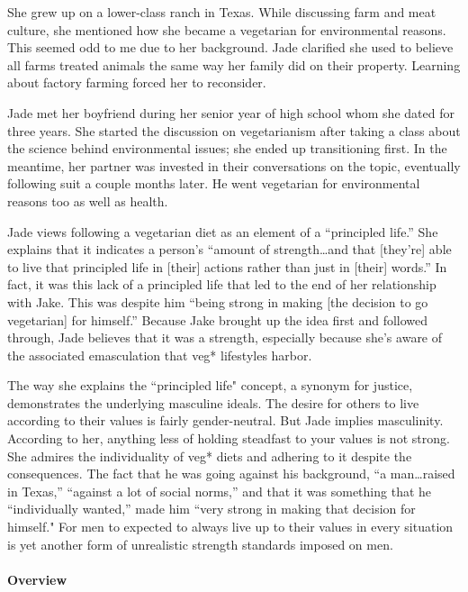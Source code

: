 \documentclass[twoside]{report}
\begin{document}
She grew up on a lower-class ranch in Texas. While discussing farm and meat culture, she mentioned how she became a vegetarian for environmental reasons.
This seemed odd to me due to her background. Jade clarified she used to believe all farms treated animals the same way her family did on their property. Learning about factory farming forced her to reconsider.

Jade met her boyfriend during her senior year of high school whom she dated for three years. She started the discussion on vegetarianism after taking a class about the science behind environmental issues; she ended up transitioning first. In the meantime, her partner was invested in their conversations on the topic, eventually following suit a couple months later. He went vegetarian for environmental reasons too as well as health.

Jade views following a vegetarian diet as an element of a ``principled
life.'' She explains that it indicates a person's
``amount of strength\ldots{}and that {[}they're{]} able to live that
principled life in {[}their{]} actions rather than just in {[}their{]}
words.'' In fact, it was this lack of a principled life that led to the
end of her relationship with Jake. This was despite him ``being strong
in making {[}the decision to go vegetarian{]} for himself.'' Because
Jake brought up the idea first and followed through, Jade believes that
it was a strength, especially because she's aware of the associated
emasculation that veg* lifestyles harbor.

The way she explains the ``principled life" concept, a synonym for
justice, demonstrates the underlying masculine ideals. The desire for
others to live according to their values is fairly gender-neutral. But Jade implies masculinity. According to her, anything less of holding steadfast to your values is not strong. She admires the individuality of veg* diets and adhering to it despite the consequences. The fact that he was going against his background, ``a man\ldots{}raised in Texas,'' ``against a lot of social
norms,'' and that it was something that he ``individually wanted,'' made
him ``very strong in making that decision for himself." For men to expected to always live up to their values in every situation is yet another form of unrealistic strength standards imposed on men.

\paragraph{Overview}
\end{document}
